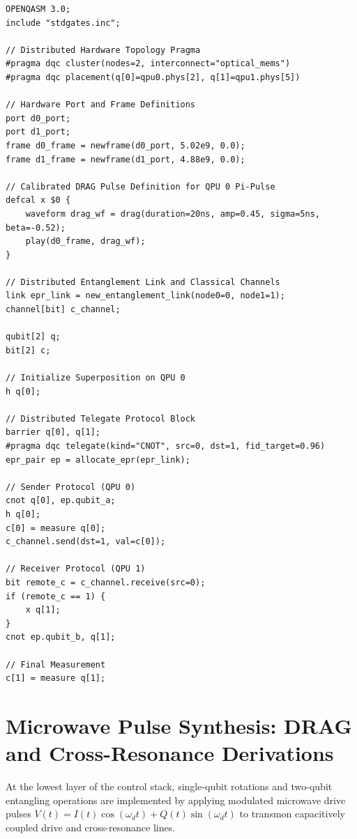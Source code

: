 \begin{lstlisting}[language=MLIR, caption={Distributed OpenQASM 3.0 Specification with Defcal Pulse Calibration}]
OPENQASM 3.0;
include "stdgates.inc";

// Distributed Hardware Topology Pragma
#pragma dqc cluster(nodes=2, interconnect="optical_mems")
#pragma dqc placement(q[0]=qpu0.phys[2], q[1]=qpu1.phys[5])

// Hardware Port and Frame Definitions
port d0_port;
port d1_port;
frame d0_frame = newframe(d0_port, 5.02e9, 0.0);
frame d1_frame = newframe(d1_port, 4.88e9, 0.0);

// Calibrated DRAG Pulse Definition for QPU 0 Pi-Pulse
defcal x $0 {
    waveform drag_wf = drag(duration=20ns, amp=0.45, sigma=5ns, beta=-0.52);
    play(d0_frame, drag_wf);
}

// Distributed Entanglement Link and Classical Channels
link epr_link = new_entanglement_link(node0=0, node1=1);
channel[bit] c_channel;

qubit[2] q;
bit[2] c;

// Initialize Superposition on QPU 0
h q[0];

// Distributed Telegate Protocol Block
barrier q[0], q[1];
#pragma dqc telegate(kind="CNOT", src=0, dst=1, fid_target=0.96)
epr_pair ep = allocate_epr(epr_link);

// Sender Protocol (QPU 0)
cnot q[0], ep.qubit_a;
h q[0];
c[0] = measure q[0];
c_channel.send(dst=1, val=c[0]);

// Receiver Protocol (QPU 1)
bit remote_c = c_channel.receive(src=0);
if (remote_c == 1) {
    x q[1];
}
cnot ep.qubit_b, q[1];

// Final Measurement
c[1] = measure q[1];
\end{lstlisting}

\section{Microwave Pulse Synthesis: DRAG and Cross-Resonance Derivations}
\label{sec:drag_pulse_synthesis}

At the lowest layer of the control stack, single-qubit rotations and two-qubit entangling operations are implemented by applying modulated microwave drive pulses $V(t) = I(t)\cos(\omega_d t) + Q(t)\sin(\omega_d t)$ to transmon capacitively coupled drive and cross-resonance lines.

